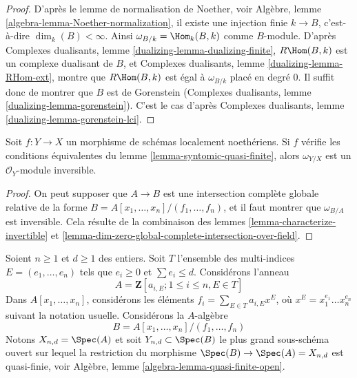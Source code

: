 \begin{proof}
D'après le lemme de normalisation de Noether, voir
Algèbre, lemme \ref{algebra-lemma-Noether-normalization},
il existe une injection finie $k \to B$, c'est-à-dire
$\dim_k(B) < \infty$. Ainsi $\omega_{B/k} = \Hom_k(B, k)$
comme $B$-module.
D'après Complexes dualisants, lemme \ref{dualizing-lemma-dualizing-finite},
$R\Hom(B, k)$ est un complexe dualisant de $B$,
et Complexes dualisants, lemme \ref{dualizing-lemma-RHom-ext},
montre que $R\Hom(B, k)$ est égal à $\omega_{B/k}$
placé en degré $0$. Il suffit donc de montrer que
$B$ est de Gorenstein
(Complexes dualisants, lemme \ref{dualizing-lemma-gorenstein}).
C'est le cas d'après Complexes dualisants, lemme
\ref{dualizing-lemma-gorenstein-lci}.
\end{proof}

\begin{lemma}
\label{lemma-dualizing-syntomic-quasi-finite}
Soit $f : Y \to X$ un morphisme de schémas localement noethériens. Si $f$
vérifie les conditions équivalentes du lemme \ref{lemma-syntomic-quasi-finite},
alors $\omega_{Y/X}$ est un $\mathcal{O}_Y$-module inversible.
\end{lemma}

\begin{proof}
On peut supposer que $A \to B$ est une intersection complète globale
relative de la forme $B = A[x_1, \ldots, x_n]/(f_1, \ldots, f_n)$,
et il faut montrer que $\omega_{B/A}$ est inversible.
Cela résulte de la combinaison des lemmes \ref{lemma-characterize-invertible} et
\ref{lemma-dim-zero-global-complete-intersection-over-field}.
\end{proof}

\begin{example}
\label{example-universal-quasi-finite-syntomic}
Soient $n \geq 1$ et $d \geq 1$ des entiers. Soit $T$ l'ensemble des
multi-indices $E = (e_1, \ldots, e_n)$ tels que $e_i \geq 0$ et
$\sum e_i \leq d$. Considérons l'anneau
$$
A = \mathbf{Z}[a_{i, E} ; 1 \leq i \leq n, E \in T]
$$
Dans $A[x_1, \ldots, x_n]$, considérons les éléments
$f_i = \sum_{E \in T} a_{i, E} x^E$, où $x^E = x_1^{e_1} \ldots x_n^{e_n}$
suivant la notation usuelle. Considérons la $A$-algèbre
$$
B = A[x_1, \ldots, x_n]/(f_1, \ldots, f_n)
$$
Notons $X_{n, d} = \Spec(A)$ et soit $Y_{n, d} \subset \Spec(B)$
le plus grand sous-schéma ouvert sur lequel la restriction du
morphisme $\Spec(B) \to \Spec(A) = X_{n, d}$ est quasi-finie, voir
Algèbre, lemme \ref{algebra-lemma-quasi-finite-open}.
\end{example}

